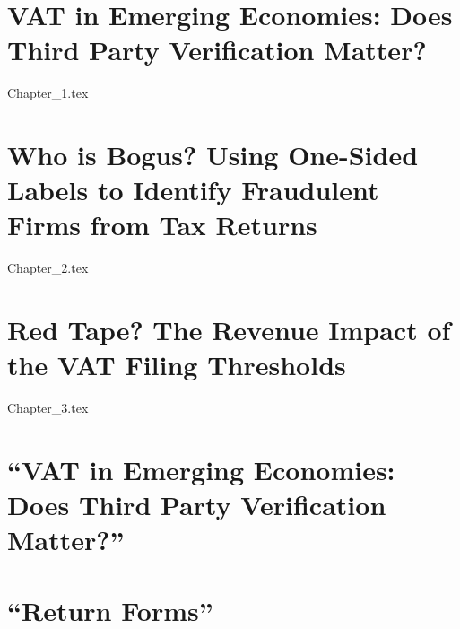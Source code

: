 \documentclass[PhD, final, double]{uclathes}
\begin{document}
\makeintropages

\chapter{VAT in Emerging Economies: Does Third Party Verification Matter?}
 {Chapter_1.tex} 

\chapter{Who is Bogus? Using One-Sided Labels to Identify Fraudulent Firms from Tax Returns}
 {Chapter_2.tex}                         %

\chapter{Red Tape? The Revenue Impact of the VAT Filing Thresholds}
 {Chapter_3.tex}                         %

\appendix
\chapter{``VAT in Emerging Economies: Does Third Party Verification Matter?''}


\chapter{``Return Forms''}


\newpage
{}


\end{document}
